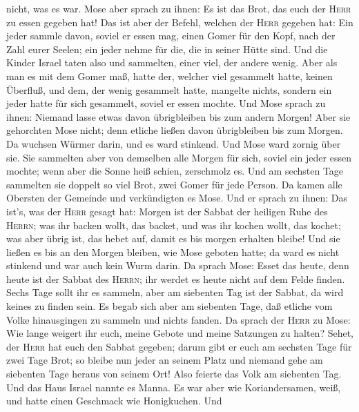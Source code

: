 nicht, was es war. Mose aber sprach zu ihnen: Es ist das Brot, das euch
der \textsc{Herr} zu essen gegeben hat!  Das ist aber der
Befehl, welchen der \textsc{Herr} gegeben hat: Ein jeder sammle davon,
soviel er essen mag, einen Gomer für den Kopf, nach der Zahl eurer
Seelen; ein jeder nehme für die, die in seiner Hütte sind.
 Und die Kinder Israel taten also und sammelten, einer
viel, der andere wenig.  Aber als man es mit dem Gomer
maß, hatte der, welcher viel gesammelt hatte, keinen Überfluß, und dem,
der wenig gesammelt hatte, mangelte nichts, sondern ein jeder hatte für
sich gesammelt, soviel er essen mochte.  Und Mose sprach
zu ihnen: Niemand lasse etwas davon übrigbleiben bis zum andern Morgen!
 Aber sie gehorchten Mose nicht; denn etliche ließen
davon übrigbleiben bis zum Morgen. Da wuchsen Würmer darin, und es ward
stinkend. Und Mose ward zornig über sie.  Sie sammelten
aber von demselben alle Morgen für sich, soviel ein jeder essen mochte;
wenn aber die Sonne heiß schien, zerschmolz es.  Und am
sechsten Tage sammelten sie doppelt so viel Brot, zwei Gomer für jede
Person. Da kamen alle Obersten der Gemeinde und verkündigten es Mose.
 Und er sprach zu ihnen: Das ist's, was der \textsc{Herr}
gesagt hat: Morgen ist der Sabbat der heiligen Ruhe des \textsc{Herrn};
was ihr backen wollt, das backet, und was ihr kochen wollt, das kochet;
was aber übrig ist, das hebet auf, damit es bis morgen erhalten bleibe!
 Und sie ließen es bis an den Morgen bleiben, wie Mose
geboten hatte; da ward es nicht stinkend und war auch kein Wurm darin.
 Da sprach Mose: Esset das heute, denn heute ist der
Sabbat des \textsc{Herrn}; ihr werdet es heute nicht auf dem Felde
finden.  Sechs Tage sollt ihr es sammeln, aber am
siebenten Tag ist der Sabbat, da wird keines zu finden sein.
 Es begab sich aber am siebenten Tage, daß etliche vom
Volke hinausgingen zu sammeln und nichts fanden.  Da
sprach der \textsc{Herr} zu Mose: Wie lange weigert ihr euch, meine
Gebote und meine Satzungen zu halten?  Sehet, der
\textsc{Herr} hat euch den Sabbat gegeben; darum gibt er euch am
sechsten Tage für zwei Tage Brot; so bleibe nun jeder an seinem Platz
und niemand gehe am siebenten Tage heraus von seinem Ort!
 Also feierte das Volk am siebenten Tag. 
Und das Haus Israel nannte es Manna. Es war aber wie Koriandersamen,
weiß, und hatte einen Geschmack wie Honigkuchen.  Und
